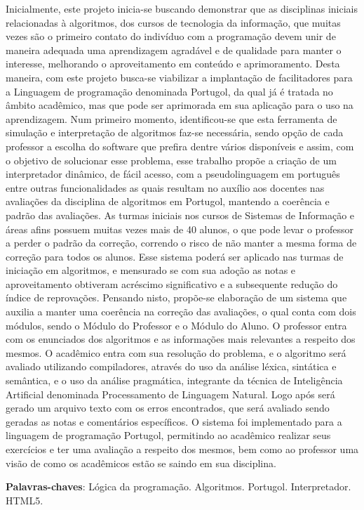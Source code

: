 

\setlength{\absparsep}{18pt} %
\begin{resumo}
Inicialmente, este projeto inicia-se buscando demonstrar que as disciplinas
iniciais relacionadas à algoritmos, dos cursos de tecnologia da informação, que
muitas vezes são o primeiro contato do indivíduo com a programação devem unir de
maneira adequada uma aprendizagem agradável e de qualidade para manter o
interesse, melhorando o aproveitamento em conteúdo e aprimoramento. Desta
maneira, com este projeto busca-se viabilizar a implantação de facilitadores
para a Linguagem de programação denominada Portugol, da qual já é tratada no
âmbito acadêmico, mas que pode ser aprimorada em sua aplicação para o uso na
aprendizagem. Num primeiro momento, identificou-se que esta ferramenta de
simulação e interpretação de algoritmos faz-se necessária, sendo opção de cada
professor a escolha do software que prefira dentre vários disponíveis e assim,
com o objetivo de solucionar esse problema, esse trabalho propõe a criação de
um interpretador dinâmico, de fácil acesso, com a pseudolinguagem em português
entre outras funcionalidades as quais resultam no auxílio aos docentes nas
avaliações da disciplina de algoritmos em Portugol, mantendo a coerência e
padrão das avaliações. As turmas iniciais nos cursos de Sistemas de Informação e
áreas afins possuem muitas vezes mais de 40 alunos, o que pode levar o professor
a perder o padrão da correção, correndo o risco de não manter a mesma forma de
correção para todos os alunos. Esse sistema poderá ser aplicado nas turmas de
iniciação em algoritmos, e mensurado se com sua adoção as notas e aproveitamento
obtiveram acréscimo significativo e a subsequente redução do índice de
reprovações. Pensando nisto, propõe-se elaboração de um sistema que auxilia a
manter uma coerência na correção das avaliações, o qual conta com dois módulos,
sendo o Módulo do Professor e o Módulo do Aluno. O professor entra com os
enunciados dos algoritmos e as informações mais relevantes a respeito dos
mesmos. O acadêmico entra com sua resolução do problema, e o algoritmo será
avaliado utilizando compiladores, através do uso da análise léxica, sintática e
semântica, e o uso da análise pragmática, integrante da técnica de Inteligência
Artificial denominada Processamento de Linguagem Natural. Logo após será gerado
um arquivo texto com os erros encontrados, que será avaliado sendo geradas as
notas e comentários específicos. O sistema foi implementado para a linguagem de
programação Portugol, permitindo ao acadêmico realizar seus exercícios e ter uma
avaliação a respeito dos mesmos, bem como ao professor uma visão de como os
acadêmicos estão se saindo em sua disciplina.

\vspace{\twolineskip}

\textbf{Palavras-chaves}: Lógica da programação. Algoritmos. Portugol. Interpretador. HTML5.
\end{resumo}

